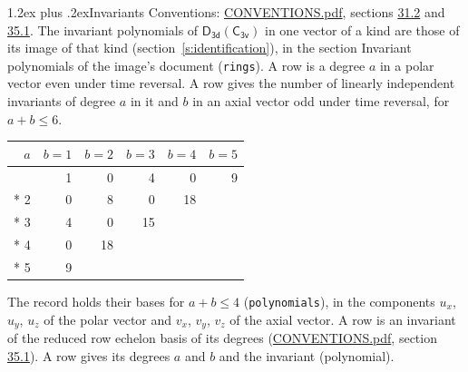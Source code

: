 \documentclass[10pt,a4paper]{article}
\makeatletter
\renewcommand\section{\@startsection{section}{1}{\z@}{-3ex plus -1ex minus -.2ex}%
  {1.2ex plus .2ex}{\normalfont\large\sffamily\bfseries\color{parttitle}}}
\numberwithin{equation}{section}
\newcommand{\grp}[1]{\mathsf{#1}}
\makeatother
\begin{document}
\section{Invariants}\label{s:invariants}
Conventions: \href{../../CONVENTIONS.pdf}{CONVENTIONS.pdf}, sections \href{../../CONVENTIONS.pdf\#conv.31.2}{31.2} and \href{../../CONVENTIONS.pdf\#conv.35.1}{35.1}.
The invariant polynomials of $\grp{D_{3d}}(\grp{C_{3v}})$ in one vector of a kind are those of its image of that kind (section~\ref{s:identification}), in the section Invariant polynomials of the image's document (\texttt{rings}).
\leavevmode\label{n:index.degree.polar}\label{n:index.degree.axial}A row is a degree $a$ in a polar vector even under time reversal. A row gives the number of linearly independent invariants of degree $a$ in it and $b$ in an axial vector odd under time reversal, for $a + b \le 6$.
{\small\begin{longtable}{@{}rrrrrr@{}}\toprule
$a$ & $b = 1$ & $b = 2$ & $b = 3$ & $b = 4$ & $b = 5$\\\midrule\endhead
\bottomrule\endfoot\endlastfoot
1 & 1 & 0 & 4 & 0 & 9\\*
2 & 0 & 8 & 0 & 18 & \\*
3 & 4 & 0 & 15 &  & \\*
4 & 0 & 18 &  &  & \\*
5 & 9 &  &  &  & \\
\bottomrule\end{longtable}}
\leavevmode\label{n:local.component.polar}\label{n:local.component.axial}The record holds their bases for $a + b \le 4$ (\texttt{polynomials}), in the components $u_{x}$, $u_{y}$, $u_{z}$ of the polar vector and $v_{x}$, $v_{y}$, $v_{z}$ of the axial vector. \label{n:head.polynomial}A row is an invariant of the reduced row echelon basis of its degrees (\href{../../CONVENTIONS.pdf}{CONVENTIONS.pdf}, section \href{../../CONVENTIONS.pdf\#conv.35.1}{35.1}). A row gives its degrees $a$ and $b$ and the invariant (polynomial).
\end{document}
